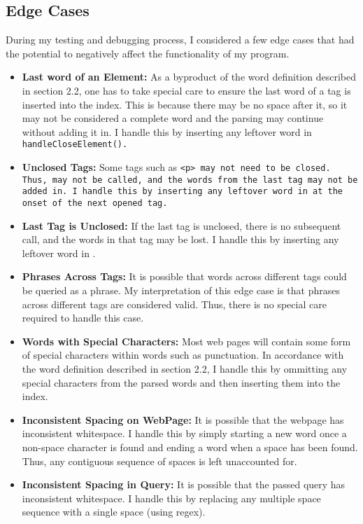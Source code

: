 \documentclass[11pt]{article}
\begin{document}
\subsection{Edge Cases}
During my testing and debugging process, I considered a few edge cases that had the potential to negatively affect the functionality of my program.
\begin{itemize}
	\item \textbf{Last word of an Element: } As a byproduct of the word definition described in section 2.2, one has to take special care to ensure the last word of a tag is inserted into the index. This is because there may be no space after it, so it may not be considered a complete word and the parsing may continue without adding it in. I handle this by inserting any leftover word in \tt{handleCloseElement()}.
	\item \textbf{Unclosed Tags: } Some tags such as \tt{<p>} may not need to be closed. Thus, \hce{} may not be called, and the words from the last tag may not be added in. I handle this by inserting any leftover word in \hoe{} at the onset of the next opened tag.
	\item \textbf{Last Tag is Unclosed: } If the last tag is unclosed, there is no subsequent \hoe{} call, and the words in that tag may be lost. I handle this by inserting any leftover word in \hde{}. 
	\item \textbf{Phrases Across Tags: } It is possible that words across different tags could be queried as a phrase. My interpretation of this edge case is that phrases across different tags are considered valid. Thus, there is no special care required to handle this case.
	\item \textbf{Words with Special Characters: } Most web pages will contain some form of special characters within words such as punctuation. In accordance with the word definition described in section 2.2, I handle this by ommitting any special characters from the parsed words and then inserting them into the index.
	\item \textbf{Inconsistent Spacing on WebPage: } It is possible that the webpage has inconsistent whitespace. I handle this by simply starting a new word once a non-space character is found and ending a word when a space has been found. Thus, any contiguous sequence of spaces is left unaccounted for.
	\item \textbf{Inconsistent Spacing in Query: } It is possible that the passed query has inconsistent whitespace. I handle this by replacing any multiple space sequence with a single space (using regex).

\end{itemize}
\end{document}
